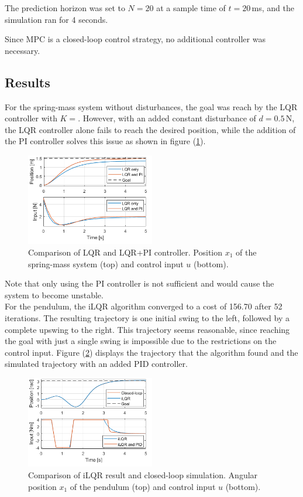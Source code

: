 \documentclass[letterpaper, 10 pt, conference]{ieeeconf}  %
\begin{document}
The prediction horizon was set to $N=20$ at a sample time of $t=20$\,ms, and the simulation ran for 4 seconds.

Since MPC is a closed-loop control strategy, no additional controller was necessary.
\subsection{Results}

For the spring-mass system without disturbances, the goal was reach by the LQR controller with $K=$. However, with an added constant disturbance of $d=0.5$\,N, the LQR controller alone fails to reach the desired position, while the addition of the PI controller solves this issue as shown in figure (\ref{fig:JanSM}).
\begin{figure}[htp] 
	\centering
	\includegraphics[width=0.5\textwidth]{MS.png}
	\caption{Comparison of LQR and LQR+PI controller. Position $x_1$ of the spring-mass system (top) and control input $u$ (bottom).}
	\label{fig:JanSM}
\end{figure} 

Note that only using the PI controller is not sufficient and would cause the system to become unstable.\\

For the pendulum, the iLQR algorithm converged to a cost of 156.70 after 52 iterations. The resulting trajectory is one initial swing to the left, followed by a complete upswing to the right. This trajectory seems reasonable, since reaching the goal with just a single swing is impossible due to the restrictions on the control input. Figure (\ref{fig:JanP1}) displays the trajectory that the algorithm found and the simulated trajectory with an added PID controller.
\begin{figure}[htp] 
	\centering
	\includegraphics[width=0.5\textwidth]{P1.png}
	\caption{Comparison of iLQR result and closed-loop simulation. Angular position $x_1$ of the pendulum (top) and control input $u$ (bottom).}
	\label{fig:JanP1}
\end{figure} 
\end{document}
